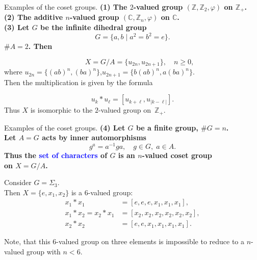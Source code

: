 \documentclass{beamer}
\def\blue#1{\textcolor{blue}{#1}}
\begin{document}
\begin{frame}{Examples of the coset groups.}
\bf{(1)} The $2$-valued group $(\mathbb{Z},\mathbb{Z}_2,\varphi)$ on $\mathbb{Z}_+$.\\[5pt]

\bf{(2)} The additive $n$-valued group $(\mathbb{C},\mathbb{Z}_n,\varphi)$ on $\mathbb{C}$.\\[5pt]

\bf{(3)} Let $G$ be the infinite dihedral group
\[
G=\{a,b\mid a^2=b^2=e\}.
\]
$\# A=2$. Then
\vspace{-0.3cm}

\[
\qquad X=G/A=\{u_{2n}, u_{2n+1}\}, \quad n\geqslant 0,
\]
where\; $u_{2n} = \{(ab)^n, (ba)^n\}$,\quad $u_{2n+1} = \{b(ab)^n, a(ba)^n\}$.\\[3pt]
Then the multiplication is given by the formula
\vspace{-0.2cm}

\[
u_k*u_{\ell}=[u_{k+\ell},u_{|k-\ell|}].
\]
Thus $X$ is isomorphic to the $2$-valued group on~$\mathbb{Z}_+$.
\end{frame}




\begin{frame}{Examples of the coset groups.}
\bf{(4)} Let $G$ be a finite group, $\# G=n$.\\ Let $A=G$ acts by inner automorphisms
\[
g^a=a^{-1}g a,\quad g\in G,\; a\in A.
\]
Thus the \blue{set of characters} of $G$ is an $n$-valued coset group\\ on $X=G/A$.
\vspace{0.2cm}

Consider $G=\Sigma_3$.\\[6pt]
Then $X=\{e, x_1,x_2\}$ is a $6$-valued group:
\begin{align*}
x_1*x_1 &= [e,e,e,x_1,x_1,x_1],\\
x_1*x_2=x_2*x_1 &= [x_2,x_2,x_2,x_2,x_2,x_2],\\
x_2*x_2 &= [e,e,x_1,x_1,x_1,x_1].
\end{align*}

Note, that this $6$-valued group on three elements is impossible to reduce to a $n$-valued group with $n<6$.
\end{frame}
\end{document}
